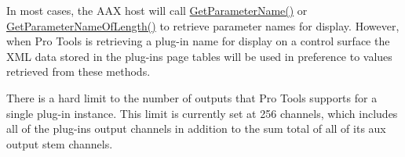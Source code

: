 \begin{DoxyRefList}
%
 In most cases, the A\+AX host will call \mbox{\hyperlink{a01669_a8f8ae4b4346e708ec6de612ef99e5a92}{Get\+Parameter\+Name()}} or \mbox{\hyperlink{a01669_a5d556ae1fa4617a6439ef347139d70eb}{Get\+Parameter\+Name\+Of\+Length()}} to retrieve parameter names for display. However, when Pro Tools is retrieving a plug-\/in name for display on a control surface the X\+ML data stored in the plug-\/in\textquotesingle{}s page tables will be used in preference to values retrieved from these methods. 
\item[Member \mbox{\hyperlink{a01781_a76266e8a07ce20cdbe5721172c32a93d}{A\+A\+X\+\_\+\+I\+Component\+Descriptor::Add\+Aux\+Output\+Stem}} (A\+A\+X\+\_\+\+C\+Field\+Index in\+Field\+Index, int32\+\_\+t in\+Stem\+Format, const char in\+Name\+U\+T\+F8\mbox{[}\mbox{]})=0]\label{a00786__compatibility_notes000055}%
%
 There is a hard limit to the number of outputs that Pro Tools supports for a single plug-\/in instance. This limit is currently set at 256 channels, which includes all of the plug-\/in\textquotesingle{}s output channels in addition to the sum total of all of its aux output stem channels.


\end{DoxyRefList}
